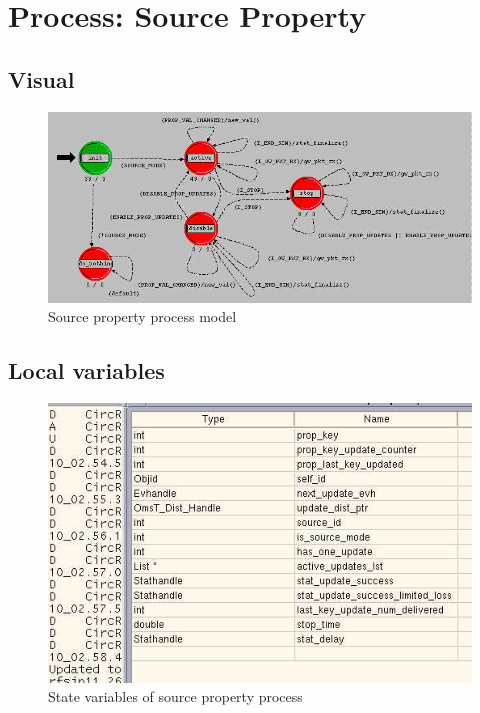
\section{Process: Source Property}

\subsection{Visual}
\begin{figure}[ht]
    \centering
    \includegraphics[scale=0.5]{images/p_source_property}
    \caption{Source property process model}
    \label{fig:appendix-a}
\end{figure}

\newpage

\subsection{Local variables}
\begin{figure}[ht]
    \centering
    \includegraphics[width=.7\textwidth]{images/state_variable_source_property}
    \caption{State variables of source property process}
    \label{fig:appendix-a_sv}
\end{figure}

